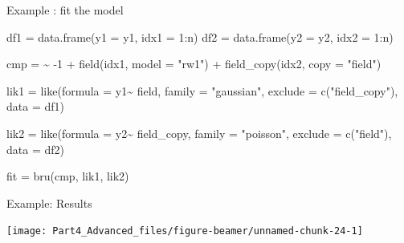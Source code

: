 \documentclass[
  ignorenonframetext,
  handout]{beamer}
\newenvironment{Shaded}{\begin{snugshade}}{\end{snugshade}}
\newcommand{\AttributeTok}[1]{\textcolor[rgb]{0.77,0.63,0.00}{#1}}
\newcommand{\DecValTok}[1]{\textcolor[rgb]{0.00,0.00,0.81}{#1}}
\newcommand{\ErrorTok}[1]{\textcolor[rgb]{0.64,0.00,0.00}{\textbf{#1}}}
\newcommand{\FunctionTok}[1]{\textcolor[rgb]{0.00,0.00,0.00}{#1}}
\newcommand{\NormalTok}[1]{#1}
\newcommand{\OtherTok}[1]{\textcolor[rgb]{0.56,0.35,0.01}{#1}}
\newcommand{\SpecialCharTok}[1]{\textcolor[rgb]{0.00,0.00,0.00}{#1}}
\newcommand{\StringTok}[1]{\textcolor[rgb]{0.31,0.60,0.02}{#1}}
\begin{document}
\begin{frame}[fragile]{Example : fit the model}
\protect\hypertarget{example-fit-the-model-2}{}
\footnotesize

\begin{Shaded}
\begin{Highlighting}[]
\NormalTok{df1 }\OtherTok{=} \FunctionTok{data.frame}\NormalTok{(}\AttributeTok{y1 =}\NormalTok{ y1, }\AttributeTok{idx1 =}  \DecValTok{1}\SpecialCharTok{:}\NormalTok{n)}
\NormalTok{df2 }\OtherTok{=} \FunctionTok{data.frame}\NormalTok{(}\AttributeTok{y2 =}\NormalTok{ y2, }\AttributeTok{idx2 =}  \DecValTok{1}\SpecialCharTok{:}\NormalTok{n)}

\NormalTok{cmp }\OtherTok{=} \ErrorTok{\textasciitilde{}} \SpecialCharTok{{-}}\DecValTok{1} \SpecialCharTok{+} 
  \FunctionTok{field}\NormalTok{(idx1, }\AttributeTok{model =} \StringTok{"rw1"}\NormalTok{) }\SpecialCharTok{+} 
  \FunctionTok{field\_copy}\NormalTok{(idx2, }\AttributeTok{copy =} \StringTok{"field"}\NormalTok{)}

\NormalTok{lik1 }\OtherTok{=} \FunctionTok{like}\NormalTok{(}\AttributeTok{formula  =}\NormalTok{ y1}\SpecialCharTok{\textasciitilde{}}\NormalTok{ field,}
            \AttributeTok{family =} \StringTok{"gaussian"}\NormalTok{,}
            \AttributeTok{exclude =} \FunctionTok{c}\NormalTok{(}\StringTok{"field\_copy"}\NormalTok{),}
            \AttributeTok{data =}\NormalTok{ df1)}

\NormalTok{lik2 }\OtherTok{=} \FunctionTok{like}\NormalTok{(}\AttributeTok{formula  =}\NormalTok{ y2}\SpecialCharTok{\textasciitilde{}}\NormalTok{ field\_copy,}
            \AttributeTok{family =} \StringTok{"poisson"}\NormalTok{,}
            \AttributeTok{exclude =} \FunctionTok{c}\NormalTok{(}\StringTok{"field"}\NormalTok{),}
            \AttributeTok{data =}\NormalTok{ df2)}

\NormalTok{fit }\OtherTok{=} \FunctionTok{bru}\NormalTok{(cmp, }
\NormalTok{          lik1,}
\NormalTok{          lik2)}
\end{Highlighting}
\end{Shaded}

\normalsize
\end{frame}

\begin{frame}{Example: Results}
\protect\hypertarget{example-results}{}
\begin{center}\texttt{[image: Part4\_Advanced\_files/figure-beamer/unnamed-chunk-24-1]} \end{center}
\end{frame}
\end{document}
